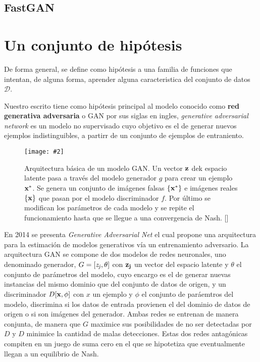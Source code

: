 \documentclass[letterpaper,12pt,oneside]{book}
\newcommand{\figura}[4]{
          \begin{figure}[H]
            \centering
            \texttt{[image: \#2]}
            \caption{#3}
            \label{#4}
          \end{figure}
                            }
\newcommand{\bb}[1]{\{#1\}}
\begin{document}
                \subsection{FastGAN}
                
        

            \section{Un conjunto de hipótesis}
                De forma general, se define como hipótesis a una familia de funciones que intentan, de alguna forma, aprender alguna caracteristica del conjunto de datos $\mathcal{D}$. 

                Nuestro escrito tiene como hipótesis principal al modelo conocido como {\bf red generativa adversaria }o GAN por sus siglas en ingles, {\it generative adversarial network} es un modelo no supervisado cuyo objetivo es el de generar nuevos ejemplos indistinguibles, a partirr de un conjunto de ejemplos de entraniento.
                
                \figura{0.25}{Imagenes/Resultados/gan_arc}{Arquitectura básica de un modelo GAN. Un vector ${\bf z}$ dek espacio latente pasa a través del modelo generador $g$ para crear un ejemplo ${\bf x^*}$. Se genera un conjunto de imágenes falsas $\bb{{\bf x^*}}$ e imágenes reales $\bb{{\bf x}}$ que pasan por el modelo discriminador $f$. Por último se modifican los parámetros de cada modelo y se repite el funcionamiento hasta que se llegue a una convergencia de Nash. [\cite{prince2023understanding}]}{fig:gan_arc}

                En 2014 se presenta {\it Generative Adversarial Net} el cual propone una arquitectura para la estimación de modelos generativos vía un entrenamiento adversario. 
                La arquitectura GAN se compone de dos modelos de redes neuronales, uno denominado generador, $G = [{\it z_j}, \theta]$ con ${\bf z_j}$ un vector del espacio latente y $\theta$ el conjunto de parámetros del modelo, cuyo encargo es el de generar nuevas instancias del mismo dominio que del conjunto de datos de origen, y un discriminador $D[{\bf x}, \phi]$ con $x$ un ejemplo y $\phi$ el conjunto de paráemtros del modelo, discrimina si los datos de entrada provienen el del dominio de datos de origen o si son imágenes del generador. Ambas redes se entrenan de manera conjunta, de manera que $G$ maximice sus posibilidades de no ser detectadas por $D$ y $D$ minimice la cantidad de malas detecciones. Estas dos redes antagónicas compiten en un juego de suma cero en el que se hipotetiza que eventualmente llegan a un equilibrio de Nash.
\end{document}
